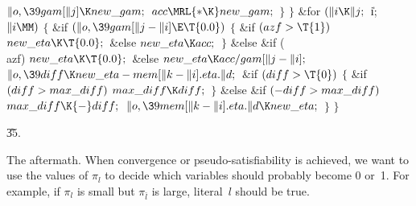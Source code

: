 ${}\|o,\39\\{gam}[\|j]\K\\{new\_gam};{}$\6
${}\\{acc}\MRL{*{\K}}\\{new\_gam};{}$\6
\4${}\}{}$\2\6
\4${}\}{}$\2\6
\&{for} ${}(\|i\K\|j;{}$ \|i; ${}\|i\MM){}$\5
${}\{{}$\1\6
\&{if} ${}(\|o,\39\\{gam}[\|j-\|i]\E\T{0.0}){}$\5
${}\{{}$\1\6
\&{if} ${}(\\{azf}>\T{1}){}$\1\5
${}\\{new\_eta}\K\T{0.0};{}$\2\6
\&{else}\1\5
${}\\{new\_eta}\K\\{acc};{}$\2\6
\4${}\}{}$\5
\2\&{else} \&{if} (\\{azf})\1\5
${}\\{new\_eta}\K\T{0.0};{}$\2\6
\&{else}\1\5
${}\\{new\_eta}\K\\{acc}/\\{gam}[\|j-\|i];{}$\2\6
${}\|o,\39\\{diff}\K\\{new\_eta}-\\{mem}[\|k-\|i].\\{eta}.\|d;{}$\6
\&{if} ${}(\\{diff}>\T{0}){}$\5
${}\{{}$\1\6
\&{if} ${}(\\{diff}>\\{max\_diff}){}$\1\5
${}\\{max\_diff}\K\\{diff};{}$\2\6
\4${}\}{}$\5
\2\&{else} \&{if} ${}({-}\\{diff}>\\{max\_diff}){}$\1\5
${}\\{max\_diff}\K{-}\\{diff};{}$\2\6
${}\|o,\39\\{mem}[\|k-\|i].\\{eta}.\|d\K\\{new\_eta};{}$\6
\4${}\}{}$\2\6
\4${}\}{}$\2\par
\U35.\fi

The aftermath. When convergence or pseudo-satisfiability
is achieved,
we want to use the
values of $\pi_l$ to decide which variables should probably become 0 or~1.
For example, if $\pi_l$ is small but $\pi_{\bar l}$ is large,
literal~$l$ should be true.

